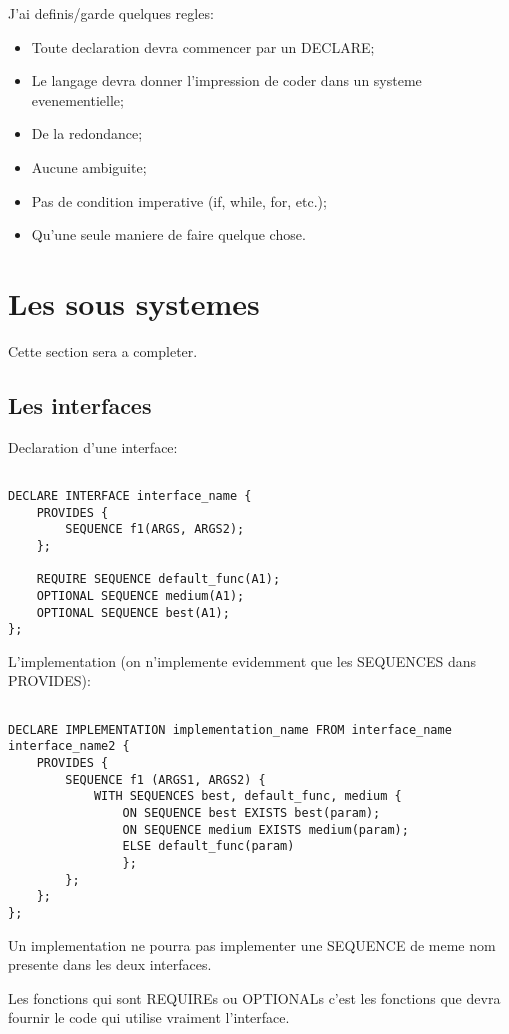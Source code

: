 \documentclass{rtxreport}
\begin{document}
J'ai definis/garde quelques regles:
\begin{itemize}
	\item Toute declaration devra commencer par un DECLARE;
	\item Le langage devra donner l'impression de coder
	dans un systeme evenementielle;
	\item De la redondance;
	\item Aucune ambiguite;
	\item Pas de condition imperative (if, while, for, etc.);
	\item Qu'une seule maniere de faire quelque chose.
\end{itemize}

\chapter{Les sous systemes}
Cette section sera a completer.

\section{Les interfaces}

Declaration d'une interface:

\begin{lstlisting}

DECLARE INTERFACE interface_name {
	PROVIDES {
		SEQUENCE f1(ARGS, ARGS2);
	};

	REQUIRE SEQUENCE default_func(A1);
	OPTIONAL SEQUENCE medium(A1);
	OPTIONAL SEQUENCE best(A1);
};

\end{lstlisting}

L'implementation (on n'implemente evidemment que les SEQUENCES dans PROVIDES):

\begin{lstlisting}

DECLARE IMPLEMENTATION implementation_name FROM interface_name interface_name2 {
	PROVIDES {
		SEQUENCE f1 (ARGS1, ARGS2) {
			WITH SEQUENCES best, default_func, medium {
				ON SEQUENCE best EXISTS best(param);
				ON SEQUENCE medium EXISTS medium(param);
				ELSE default_func(param)
				};
		};
	};
};
\end{lstlisting}

Un implementation ne pourra pas implementer une SEQUENCE de meme nom
presente dans les deux interfaces.

Les fonctions qui sont REQUIREs ou OPTIONALs c'est les fonctions
que devra fournir le code qui utilise vraiment l'interface.
\end{document}
